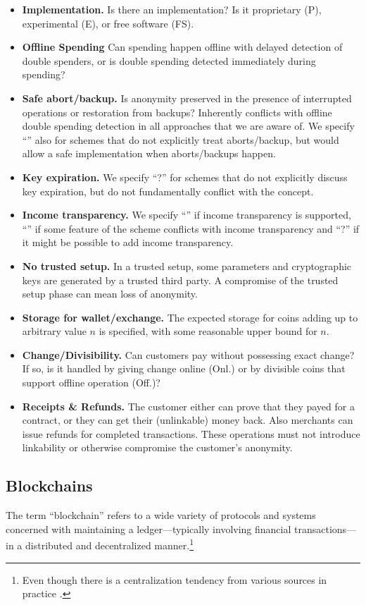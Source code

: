 \begin{itemize}
  \item \textbf{Implementation.}
    Is there an implementation?  Is it proprietary (P), experimental (E), or free software (FS).
  \item \textbf{Offline Spending}
    Can spending happen offline with delayed detection of double spenders, or
    is double spending detected immediately during spending?
  \item \textbf{Safe abort/backup.}
    Is anonymity preserved in the presence of interrupted operations
    or restoration from backups?  Inherently conflicts with offline double
    spending detection in all approaches that we are aware of.
    We specify ``\YES'' also for schemes that do not explicitly treat aborts/backup,
    but would allow a safe implementation when aborts/backups happen.
  \item \textbf{Key expiration.}
    We specify ``?'' for schemes that do not explicitly discuss key expiration,
    but do not fundamentally conflict with the concept.
  \item \textbf{Income transparency.}
    We specify ``\YES'' if income transparency is supported, ``\NO'' if some feature of
    the scheme conflicts with income transparency and ``?'' if it might be possible
    to add income transparency.
  \item \textbf{No trusted setup.}
    In a trusted setup, some parameters and cryptographic keys are generated
    by a trusted third party.  A compromise of the trusted setup phase can mean loss
    of anonymity.
  \item \textbf{Storage for wallet/exchange.}
    The expected storage for coins adding up to arbitrary value $n$ is specified,
    with some reasonable upper bound for $n$.
  \item \textbf{Change/Divisibility.}
    Can customers pay without possessing exact change?  If so, is it handled
    by giving change online (Onl.) or by divisible coins that support offline
    operation (Off.)?
  \item \textbf{Receipts \& Refunds.}
    The customer either can prove that they payed for
    a contract, or they can get their (unlinkable) money back.
    Also merchants can issue refunds for completed transactions.
    These operations must not introduce linkability or otherwise
    compromise the customer's anonymity.
\end{itemize}


\subsection{Blockchains}
The term ``blockchain'' refers to a wide variety of protocols and systems concerned with
maintaining a ledger---typically involving financial transactions---in a
distributed and decentralized manner.\footnote{Even though there is a centralization tendency
from various sources in practice \cite{walch2019deconstructing}.}

